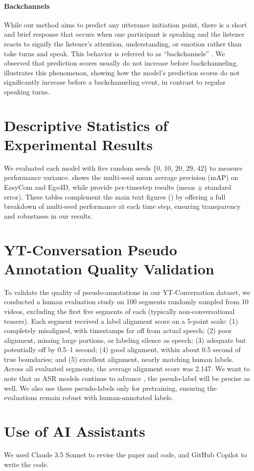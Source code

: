 \documentclass[11pt]{article}
\begin{document}
\paragraph{Backchannels}
While our method aims to predict any utterance initiation point, there is a short and brief response that occurs when one participant is speaking and the listener reacts to signify the listener's attention, understanding, or emotion rather than take turns and speak. This behavior is referred to as ``backchannels'' \cite{yngve1970getting, skantze2021turnreview}. We observed that prediction scores usually do not increase before backchanneling.  illustrates this phenomenon, showing how the model's prediction scores do not significantly increase before a backchanneling event, in contrast to regular speaking turns.


\section{Descriptive Statistics of Experimental Results}
\label{app:stat_results}

We evaluated each model with five random seeds \{0, 10, 20, 29, 42\} to measure performance variance.  shows the multi-seed mean average precision (mAP) on EasyCom and Ego4D, while  provide per-timestep results (mean $\pm$ standard error). These tables complement the main text figures () by offering a full breakdown of multi-seed performance at each time step, ensuring transparency and robustness in our results.




\section{YT-Conversation Pseudo Annotation Quality Validation}
\label{app:YTConv_quality_validation}
To validate the quality of pseudo-annotations in our YT-Conversation dataset, we conducted a human evaluation study on 100 segments randomly sampled from 10 videos, excluding the first five segments of each (typically non-conversational teasers). Each segment received a label alignment score on a 5-point scale: 
(1) completely misaligned, with timestamps far off from actual speech; 
(2) poor alignment, missing large portions, or labeling silence as speech; 
(3) adequate but potentially off by 0.5–1 second; 
(4) good alignment, within about 0.5 second of true boundaries; and 
(5) excellent alignment, nearly matching human labels. 
Across all evaluated segments, the average alignment score was 2.147. We want to note that as ASR models continue to advance \cite{zusag2024crisperwhisper}, the pseudo-label will be precise as well. We also use these pseudo-labels only for pretraining, ensuring the evaluations remain robust with human-annotated labels.






\section{Use of AI Assistants}
We used Claude 3.5 Sonnet to revise the paper and code, and GitHub Copilot to write the code.
\end{document}
